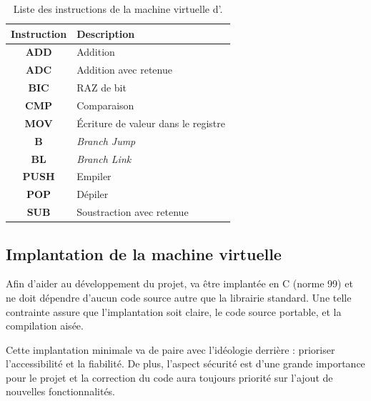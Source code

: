 \documentclass[11pt,twoside]{article}
\begin{document}
\begin{table}[tb]
  \begin{centering}
    \begin{tabular}{|c|l|}
      \hline
      \textbf{Instruction} & \textbf{Description}                \\
      \hline
      \hline
      \textbf{ADD}         & Addition                            \\
      \hline
      \textbf{ADC}         & Addition avec retenue               \\
      \hline
      \textbf{BIC}         & RAZ de bit                          \\
      \hline
      \textbf{CMP}         & Comparaison                         \\
      \hline
      \textbf{MOV}         & Écriture de valeur dans le registre \\
      \hline
      \textbf{B}           & \emph{Branch Jump}                  \\
      \hline
      \textbf{BL}          & \emph{Branch Link}                  \\
      \hline
      \textbf{PUSH}        & Empiler                             \\
      \hline
      \textbf{POP}         & Dépiler                             \\
      \hline
      \textbf{SUB}         & Soustraction avec retenue           \\
      \hline
    \end{tabular}
    \par\end{centering}
  \caption{Liste des instructions de la machine virtuelle d'.}
  \label{tab:instructions}
\end{table}


\subsection{Implantation de la machine virtuelle}

Afin d'aider au développement du projet,  va être implantée
en C (norme 99) et ne doit dépendre d'aucun code source autre que
la librairie standard. Une telle contrainte assure que l'implantation
soit claire, le code source portable, et la compilation aisée.

Cette implantation minimale va de paire avec l'idéologie derrière
 : prioriser l'accessibilité et la fiabilité. De plus, l'aspect
sécurité est d'une grande importance pour le projet et la correction
du code aura toujours priorité sur l'ajout de nouvelles fonctionnalités.
\end{document}
